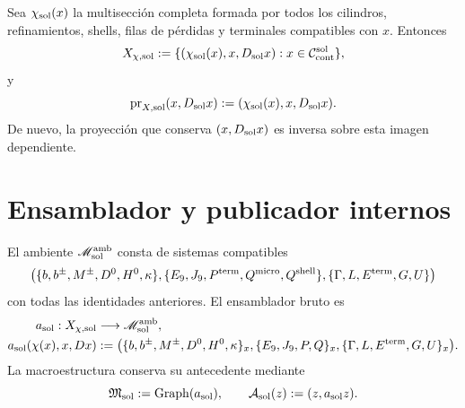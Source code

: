Sea \(\chi_{\rm sol}(x)\) la multisección completa formada por todos los
cilindros, refinamientos, shells, filas de pérdidas y terminales compatibles
con \(x\).  Entonces
\begin{equation}\label{eq:pdfv2-sol-xchi}
 X_{\chi,{\rm sol}}
 :=\{(\chi_{\rm sol}(x),x,D_{\rm sol}x):
 x\in\mathcal C_{\rm cont}^{\rm sol}\},
\end{equation}
y
\begin{equation}\label{eq:pdfv2-sol-prx}
 \operatorname{pr}_{X,{\rm sol}}(x,D_{\rm sol}x)
 :=(\chi_{\rm sol}(x),x,D_{\rm sol}x).
\end{equation}
De nuevo, la proyección que conserva \((x,D_{\rm sol}x)\) es inversa sobre
esta imagen dependiente.

\section{Ensamblador y publicador internos}
\label{sec:pdfv2-sol-assembler-publisher}

El ambiente \(\mathscr M_{\rm sol}^{\rm amb}\) consta de sistemas
compatibles
\[
 \bigl(
 \{b,b^\pm,M^\pm,D^0,H^0,\kappa\},
 \{E_9,J_9,P^{\rm term},Q^{\rm micro},Q^{\rm shell}\},
 \{\Gamma,L,E^{\rm term},G,U\}
 \bigr)
\]
con todas las identidades anteriores.  El ensamblador bruto es
\begin{equation}\label{eq:pdfv2-sol-assembler}
 \begin{aligned}
 a_{\rm sol}:X_{\chi,{\rm sol}}&\longrightarrow
 \mathscr M_{\rm sol}^{\rm amb},\\
 a_{\rm sol}(\chi(x),x,Dx)&:=
 \bigl(
 \{b,b^\pm,M^\pm,D^0,H^0,\kappa\}_x,
 \{E_9,J_9,P,Q\}_x,
 \{\Gamma,L,E^{\rm term},G,U\}_x
 \bigr).
 \end{aligned}
\end{equation}
La macroestructura conserva su antecedente mediante
\begin{equation}\label{eq:pdfv2-sol-macro-graph}
 \mathfrak M_{\rm sol}:=\operatorname{Graph}(a_{\rm sol}),
 \qquad
 \mathcal A_{\rm sol}(z):=(z,a_{\rm sol}z).
\end{equation}

